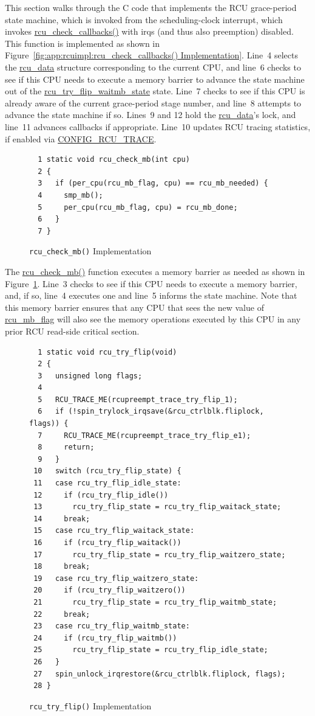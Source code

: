 This section walks through the C code that implements the RCU
grace-period state machine, which is invoked from the scheduling-clock
interrupt, which invokes \url{rcu_check_callbacks()} with
irqs (and thus also preemption) disabled.
This function is implemented as shown in
Figure~\ref{fig:app:rcuimpl:rcu_check_callbacks() Implementation}.
Line~4 selects the \url{rcu_data} structure corresponding
to the current CPU, and line~6 checks to see if this CPU needs
to execute a memory barrier to advance the state machine out of the
\url{rcu_try_flip_waitmb_state} state.
Line~7 checks to see if this CPU is already aware of the
current grace-period stage number, and line~8 attempts to advance the
state machine if so.
Lines~9 and 12 hold the \url{rcu_data}'s lock, and
line~11 advances callbacks if appropriate.
Line~10 updates RCU tracing statistics, if enabled via
\url{CONFIG_RCU_TRACE}.

\begin{figure}[tbp]
{ \scriptsize
\begin{verbatim}
  1 static void rcu_check_mb(int cpu)
  2 {
  3   if (per_cpu(rcu_mb_flag, cpu) == rcu_mb_needed) {
  4     smp_mb();
  5     per_cpu(rcu_mb_flag, cpu) = rcu_mb_done;
  6   }
  7 }
\end{verbatim}
}
\caption{{\tt rcu\_check\_mb()} Implementation}
\label{fig:app:rcuimpl:rcu_check_mb() Implementation}
\end{figure}

The \url{rcu_check_mb()} function executes a memory barrier
as needed as shown in
Figure~\ref{fig:app:rcuimpl:rcu_check_mb() Implementation}.
Line~3 checks to see if this CPU needs to execute a memory barrier,
and, if so, line~4 executes one and line~5 informs the state
machine.
Note that this memory barrier ensures that any CPU that sees the new
value of \url{rcu_mb_flag} will also see the memory operations
executed by this CPU in any prior RCU read-side critical section.

\begin{figure}[tbp]
{ \scriptsize
\begin{verbatim}
  1 static void rcu_try_flip(void)
  2 {
  3   unsigned long flags;
  4
  5   RCU_TRACE_ME(rcupreempt_trace_try_flip_1);
  6   if (!spin_trylock_irqsave(&rcu_ctrlblk.fliplock, flags)) {
  7     RCU_TRACE_ME(rcupreempt_trace_try_flip_e1);
  8     return;
  9   }
 10   switch (rcu_try_flip_state) {
 11   case rcu_try_flip_idle_state:
 12     if (rcu_try_flip_idle())
 13       rcu_try_flip_state = rcu_try_flip_waitack_state;
 14     break;
 15   case rcu_try_flip_waitack_state:
 16     if (rcu_try_flip_waitack())
 17       rcu_try_flip_state = rcu_try_flip_waitzero_state;
 18     break;
 19   case rcu_try_flip_waitzero_state:
 20     if (rcu_try_flip_waitzero())
 21       rcu_try_flip_state = rcu_try_flip_waitmb_state;
 22     break;
 23   case rcu_try_flip_waitmb_state:
 24     if (rcu_try_flip_waitmb())
 25       rcu_try_flip_state = rcu_try_flip_idle_state;
 26   }
 27   spin_unlock_irqrestore(&rcu_ctrlblk.fliplock, flags);
 28 }
\end{verbatim}
}
\caption{{\tt rcu\_try\_flip()} Implementation}
\label{fig:app:rcuimpl:rcu_try_flip() Implementation}
\end{figure}

